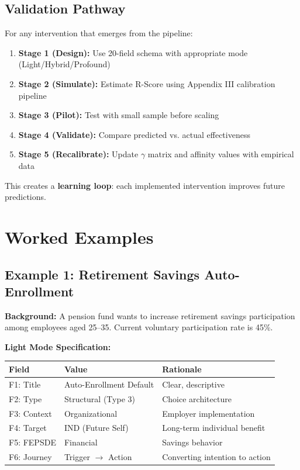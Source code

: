 \subsection{Validation Pathway}

For any intervention that emerges from the pipeline:

\begin{enumerate}
\item \textbf{Stage 1 (Design):} Use 20-field schema with appropriate mode (Light/Hybrid/Profound)
\item \textbf{Stage 2 (Simulate):} Estimate R-Score using Appendix III calibration pipeline
\item \textbf{Stage 3 (Pilot):} Test with small sample before scaling
\item \textbf{Stage 4 (Validate):} Compare predicted vs. actual effectiveness
\item \textbf{Stage 5 (Recalibrate):} Update $\gamma$ matrix and affinity values with empirical data
\end{enumerate}

This creates a \textbf{learning loop}: each implemented intervention improves future predictions.


\section{Worked Examples}
\label{sec:17-examples}

\subsection{Example 1: Retirement Savings Auto-Enrollment}

\textbf{Background:} A pension fund wants to increase retirement savings participation among employees aged 25--35. Current voluntary participation rate is 45\%.

\textbf{Light Mode Specification:}

\begin{table}[htbp]
\centering
\small
\renewcommand{\arraystretch}{1.3}
\begin{tabular}{@{}llp{6cm}@{}}
\toprule
\textbf{Field} & \textbf{Value} & \textbf{Rationale} \\
\midrule
F1: Title & Auto-Enrollment Default & Clear, descriptive \\
F2: Type & Structural (Type 3) & Choice architecture \\
F3: Context & Organizational & Employer implementation \\
F4: Target & IND (Future Self) & Long-term individual benefit \\
F5: FEPSDE & Financial & Savings behavior \\
F6: Journey & Trigger $\rightarrow$ Action & Converting intention to action \\
\bottomrule
\end{tabular}
\end{table}


